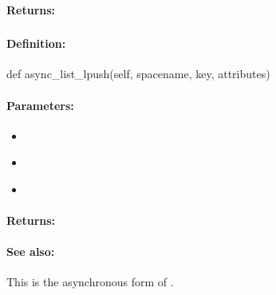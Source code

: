 \paragraph{Returns:}


\pagebreak
\subsubsection{}
\label{api:python:async_list_lpush}


\paragraph{Definition:}
\begin{pythoncode}
def async_list_lpush(self, spacename, key, attributes)
\end{pythoncode}

\paragraph{Parameters:}
\begin{itemize}[noitemsep]
\item {}\\

\item {}\\

\item {}\\

\end{itemize}

\paragraph{Returns:}


\paragraph{See also:}  This is the asynchronous form of .

\pagebreak
\subsubsection{}
\label{api:python:microtransaction_list_lpush}


